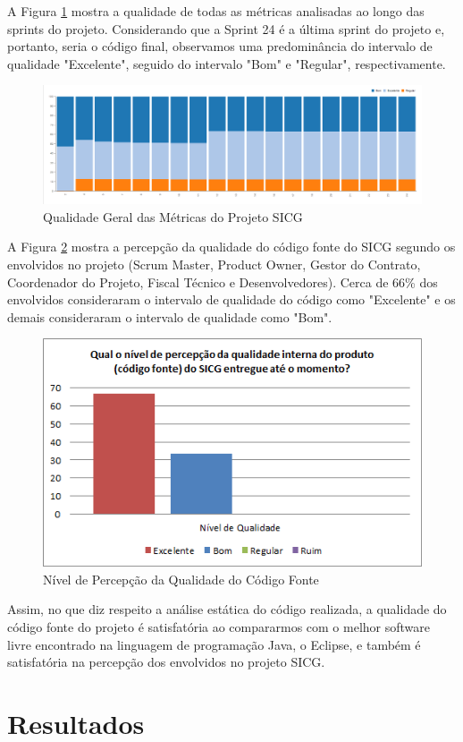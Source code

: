 A Figura \ref{qualidadesprint} mostra a qualidade de todas as métricas analisadas ao longo das sprints do projeto. Considerando que a Sprint 24 é a última sprint do projeto e, portanto, seria o código final, observamos uma predominância do intervalo de qualidade "Excelente", seguido do intervalo "Bom" e "Regular", respectivamente. 

\begin{figure}[H]
		\centering
			\includegraphics[scale=0.4]{figuras/qualidadesprint.png}
		\caption{Qualidade Geral das Métricas do Projeto SICG}
		\label{qualidadesprint}
\end{figure}


A Figura \ref{percepcaoqualidade} mostra a percepção da qualidade do código fonte do SICG segundo os envolvidos no projeto (Scrum Master, Product Owner, Gestor do Contrato, Coordenador do Projeto, Fiscal Técnico e Desenvolvedores). Cerca de 66\% dos envolvidos consideraram  o intervalo de qualidade do código como "Excelente" e os demais consideraram
o intervalo de qualidade como "Bom".

\begin{figure}[H]
		\centering
			\includegraphics[scale=1.0]{figuras/percepcaoqualidade.png}
		\caption{Nível de Percepção da Qualidade do Código Fonte}
		\label{percepcaoqualidade}
\end{figure}

Assim, no que diz respeito a análise estática do código realizada, a qualidade do código fonte do projeto é satisfatória ao compararmos com o melhor software livre encontrado na linguagem de programação Java, o Eclipse, e também é satisfatória na percepção dos envolvidos no projeto SICG. 

\section[Resultados]{Resultados}

